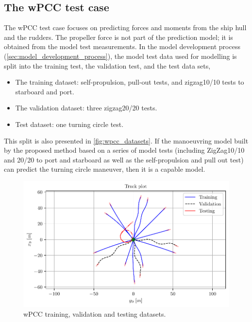 \subsection{The wPCC test case}
\label{\detokenize{05.01_case_studies:the-wpcc-test-scenarios}}
The wPCC test case focuses on predicting forces and moments from the ship hull and the rudders. The propeller force is not part of the prediction model; it is obtained from the model test measurements.
In the model development process (\autoref{sec:model_development_process}), the model test data used for modelling is split into the training test, the validation test, and the test data sets, 
\begin{itemize}
    \item The training dataset: self-propulsion, pull-out tests, and zigzag10/10 tests to starboard and port.
    \item The validation dataset: three zigzag20/20 tests.
    \item Test dataset: one turning circle test.
\end{itemize}
\noindent This split is also presented in \autoref{fig:wpcc_datasets}. If the manoeuvring model built by the proposed method based on a series of model tests (including ZigZag10/10 and 20/20 to port and starboard as well as the self-propulsion and pull out test) \cite{imo_standards_2002} can predict the turning circle maneuver, then it is a capable model.
\begin{figure}[h!]
\centering
\includegraphics[width=0.8\linewidth]{kappa/images/3.pdf}
\caption{wPCC training, validation and testing datasets.}
\label{fig:wpcc_datasets}
\end{figure}

